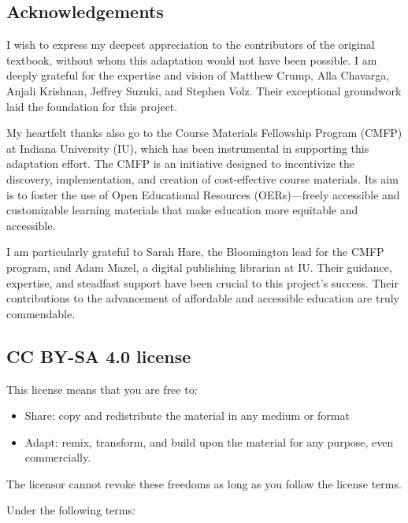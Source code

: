 \documentclass[
  letterpaper,
  DIV=11,
  numbers=noendperiod]{scrreprt}
\providecommand{\tightlist}{%
  \setlength{\itemsep}{0pt}\setlength{\parskip}{0pt}}\usepackage{longtable,booktabs,array}
\begin{document}
\subsection*{Acknowledgements}\label{acknowledgements}

I wish to express my deepest appreciation to the contributors of the
original textbook, without whom this adaptation would not have been
possible. I am deeply grateful for the expertise and vision of Matthew
Crump, Alla Chavarga, Anjali Krishnan, Jeffrey Suzuki, and Stephen Volz.
Their exceptional groundwork laid the foundation for this project.

My heartfelt thanks also go to the Course Materials Fellowship Program
(CMFP) at Indiana University (IU), which has been instrumental in
supporting this adaptation effort. The CMFP is an initiative designed to
incentivize the discovery, implementation, and creation of
cost-effective course materials. Its aim is to foster the use of Open
Educational Resources (OERs)---freely accessible and customizable
learning materials that make education more equitable and accessible.

I am particularly grateful to Sarah Hare, the Bloomington lead for the
CMFP program, and Adam Mazel, a digital publishing librarian at IU.
Their guidance, expertise, and steadfast support have been crucial to
this project's success. Their contributions to the advancement of
affordable and accessible education are truly commendable.

\subsection*{CC BY-SA 4.0 license}\label{cc-by-sa-4.0-license}

This license means that you are free to:

\begin{itemize}
\tightlist
\item
  Share: copy and redistribute the material in any medium or format
\item
  Adapt: remix, transform, and build upon the material for any purpose,
  even commercially.
\end{itemize}

The licensor cannot revoke these freedoms as long as you follow the
license terms.

Under the following terms:
\end{document}
